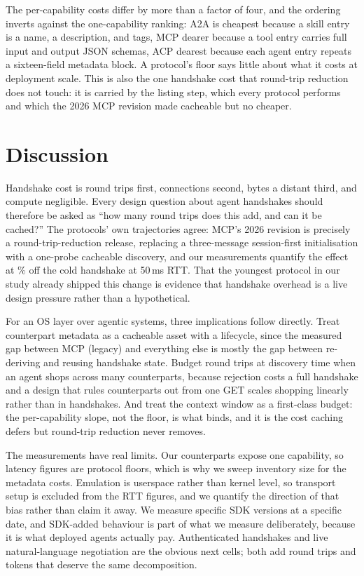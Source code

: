 \documentclass{article}
\newcommand{\mcpl}{MCP (legacy)}
\begin{document}
The per-capability costs differ by more than a factor of four, and the
ordering inverts against the one-capability ranking: A2A is cheapest
because a skill entry is a name, a description, and tags, MCP dearer
because a tool entry carries full input and output JSON schemas, ACP
dearest because each agent entry repeats a sixteen-field metadata block. A
protocol's floor says little about what it costs at deployment scale. This
is also the one handshake cost that round-trip reduction does not touch: it
is carried by the listing step, which every protocol performs and which the
2026 MCP revision made cacheable but no cheaper.

\section{Discussion}
\label{sec:discussion}

Handshake cost is round trips first, connections second, bytes a distant
third, and compute negligible. Every design question about agent handshakes
should therefore be asked as ``how many round trips does this add, and can
it be cached?'' The protocols' own trajectories agree: MCP's 2026 revision
is precisely a round-trip-reduction release, replacing a three-message
session-first initialisation with a one-probe cacheable discovery, and our
measurements quantify the effect at \McpModernSpeedup{}\% off the cold
handshake at 50\,ms RTT. That the youngest protocol in our study already
shipped this change is evidence that handshake overhead is a live design
pressure rather than a hypothetical.

For an OS layer over agentic systems, three implications follow directly.
Treat counterpart metadata as a cacheable asset with a lifecycle, since the
measured gap between \mcpl{} and everything else is mostly the gap between
re-deriving and reusing handshake state. Budget round trips at discovery
time when an agent shops across many counterparts, because rejection costs
a full handshake and a design that rules counterparts out from one GET
scales shopping linearly rather than in handshakes. And treat the context
window as a first-class budget: the per-capability slope, not the floor, is
what binds, and it is the cost caching defers but round-trip reduction
never removes.

The measurements have real limits. Our counterparts expose one capability,
so latency figures are protocol floors, which is why we sweep inventory
size for the metadata costs. Emulation is userspace rather than kernel
level, so transport setup is excluded from the RTT figures, and we quantify
the direction of that bias rather than claim it away. We measure specific
SDK versions at a specific date, and SDK-added behaviour is part of what we
measure deliberately, because it is what deployed agents actually pay.
Authenticated handshakes and live natural-language negotiation are the
obvious next cells; both add round trips and tokens that deserve the same
decomposition.
\end{document}
